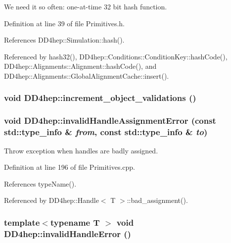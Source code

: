 We need it so often: one-\/at-\/time 32 bit hash function. 

Definition at line 39 of file Primitives.h.

References DD4hep::Simulation::hash().

Referenced by hash32(), DD4hep::Conditions::ConditionKey::hashCode(), DD4hep::Alignments::Alignment::hashCode(), and DD4hep::Alignments::GlobalAlignmentCache::insert().\hypertarget{namespace_d_d4hep_a74a35c08bae34ad9a479a1726eafab98}{
\subsubsection[{increment\_\-object\_\-validations}]{\setlength{\rightskip}{0pt plus 5cm}void DD4hep::increment\_\-object\_\-validations ()}}
\label{namespace_d_d4hep_a74a35c08bae34ad9a479a1726eafab98}
\hypertarget{namespace_d_d4hep_a5f946a2ebf8795b6a70037ff00ad2aab}{
\subsubsection[{invalidHandleAssignmentError}]{\setlength{\rightskip}{0pt plus 5cm}void DD4hep::invalidHandleAssignmentError (const std::type\_\-info \& {\em from}, \/  const std::type\_\-info \& {\em to})}}
\label{namespace_d_d4hep_a5f946a2ebf8795b6a70037ff00ad2aab}


Throw exception when handles are badly assigned. 

Definition at line 196 of file Primitives.cpp.

References typeName().

Referenced by DD4hep::Handle$<$ T $>$::bad\_\-assignment().\hypertarget{namespace_d_d4hep_aba3125de6fc50debd292ce20b9ea62c4}{
\subsubsection[{invalidHandleError}]{\setlength{\rightskip}{0pt plus 5cm}template$<$typename T $>$ void DD4hep::invalidHandleError ()}}
\label{namespace_d_d4hep_aba3125de6fc50debd292ce20b9ea62c4}


